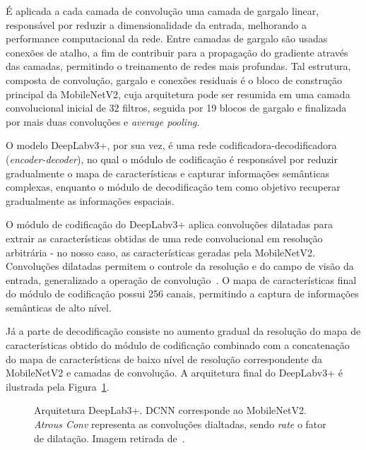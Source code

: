 \documentclass{bmvc2k}
\begin{document}
É aplicada a cada camada de convolução uma camada de gargalo linear, responsável por reduzir a dimensionalidade da entrada, melhorando a performance computacional da rede. Entre camadas de gargalo são usadas conexões de atalho, a fim de contribuir para a propagação do gradiente através das camadas, permitindo o treinamento de redes mais profundas. Tal estrutura, composta de convolução, gargalo e conexões residuais é o bloco de construção principal da MobileNetV2, cuja arquitetura pode ser resumida em uma camada convolucional inicial de 32 filtros, seguida por 19 blocos de gargalo e finalizada por mais duas convoluções e \textit{average pooling}.

O modelo DeepLabv3+, por sua vez, é uma rede codificadora-decodificadora (\textit{encoder-decoder}), no qual o módulo de codificação é responsável por reduzir gradualmente o mapa de características e capturar informações semânticas complexas, enquanto o módulo de decodificação tem como objetivo recuperar gradualmente as informações espaciais.

O módulo de codificação do DeepLabv3+ aplica convoluções dilatadas para extrair as características obtidas de uma rede convolucional em resolução arbitrária - no nosso caso, as características geradas pela MobileNetV2. Convoluções dilatadas permitem o controle da resolução e do campo de visão da entrada, generalizado a operação de convolução~\cite{deeplab1}. O mapa de características final do módulo de codificação possui 256 canais, permitindo a captura de informações semânticas de alto nível.

Já a parte de decodificação consiste no aumento gradual da resolução do mapa de características obtido do módulo de codificação combinado com a concatenação do mapa de características de baixo nível de resolução correspondente da MobileNetV2 e camadas de convolução. A arquitetura final do DeepLabv3+ é ilustrada pela Figura~\ref{fig:deeplab}.

\begin{figure}[htb]
\centering
{}
\caption{Arquitetura DeepLab3+. DCNN corresponde ao MobileNetV2. \textit{Atrous Conv} representa as convoluções dialtadas, sendo \textit{rate} o fator de dilatação. Imagem retirada de~\cite{deeplab}.}
\label{fig:deeplab}
\end{figure}
\end{document}
